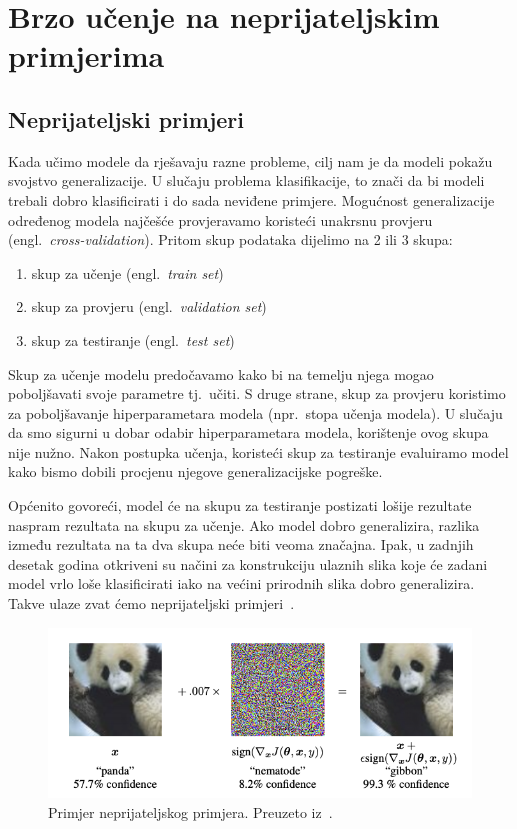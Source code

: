 \documentclass[times, utf8, zavrsni, numeric]{fer}
\begin{document}
\chapter{Brzo učenje na neprijateljskim primjerima}

\section{Neprijateljski primjeri}

Kada učimo modele da rješavaju razne probleme, cilj nam je da modeli pokažu svojstvo generalizacije. 
U slučaju problema klasifikacije, to znači da bi modeli trebali dobro klasificirati i do sada neviđene primjere.
Mogućnost generalizacije određenog modela najčešće provjeravamo koristeći unakrsnu provjeru (engl.\ \textit{cross-validation}).
Pritom skup podataka dijelimo na 2 ili 3 skupa: 

\begin{enumerate}
    \item skup za učenje (engl.\ \textit{train set})
    \item skup za provjeru (engl.\ \textit{validation set})
    \item skup za testiranje (engl.\ \textit{test set})
\end{enumerate}

Skup za učenje modelu predočavamo kako bi na temelju njega mogao poboljšavati svoje parametre tj.\ učiti. 
S druge strane, skup za provjeru koristimo za poboljšavanje hiperparametara modela (npr.\ stopa učenja modela). 
U slučaju da smo sigurni u dobar odabir hiperparametara modela, korištenje ovog skupa nije nužno. 
Nakon postupka učenja, koristeći skup za testiranje evaluiramo model kako bismo dobili procjenu njegove generalizacijske pogreške.

Općenito govoreći, model će na skupu za testiranje postizati lošije rezultate naspram rezultata na skupu za učenje. 
Ako model dobro generalizira, razlika između rezultata na ta dva skupa neće biti veoma značajna. 
Ipak, u zadnjih desetak godina otkriveni su načini za konstrukciju ulaznih slika koje će zadani model vrlo loše klasificirati iako na većini prirodnih slika dobro generalizira. 
Takve ulaze zvat ćemo neprijateljski primjeri~\cite{goodfellow2014explaining}.

\pagebreak

\begin{figure}[htb]
    \centering
    \includegraphics[scale=0.5]{adversarial_example.png}
    \caption{Primjer neprijateljskog primjera. Preuzeto iz~\cite{goodfellow2014explaining}.}
    \label{fig:adv_example}
\end{figure}
\end{document}
